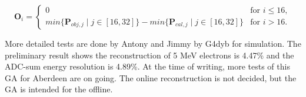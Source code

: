 \begin{equation}
\label{eq:fitnessOTimeOffset}
\mathbf{O}_i =
\left\{
    \begin{array}{ll}
    0 & \mbox{for } i\leq16, \\
    min\{\mathbf{P}_{obj,j}{\mid}j\in[16,32]\} - min\{\mathbf{P}_{cal,j}{\mid}j\in[16,32]\}  & \mbox{for } i>16.
    \end{array} \right.
\end{equation}


More detailed tests are done by Antony and Jimmy by G4dyb for simulation.
The preliminary result shows the reconstruction of 5 MeV electrons is 4.47\%
and the ADC-sum energy resolution is 4.89\%.
At the time of writing, more tests of this GA for Aberdeen are on going.
The online reconstruction is not decided, but the GA is intended for the offline.
